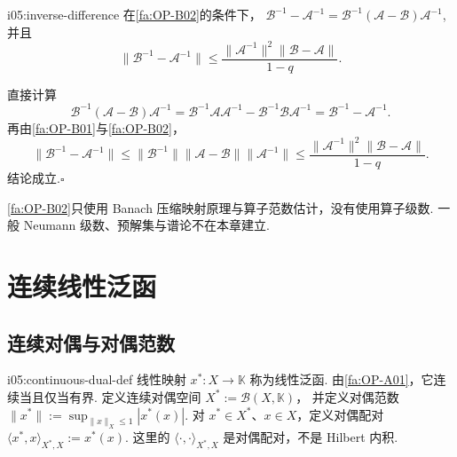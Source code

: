 \begin{FAProposition}[B][局部逆映射估计]{i05:inverse-difference}
在\autoref{fa:OP-B02}的条件下， \(\displaystyle \mathcal B^{-1}-\mathcal A^{-1} =\mathcal B^{-1}(\mathcal A-\mathcal B)\mathcal A^{-1}\),
并且
\[
\|\mathcal B^{-1}-\mathcal A^{-1}\|
\leqslant
\frac{\|\mathcal A^{-1}\|^2\|\mathcal B-\mathcal A\|}{1-q}.
\]
\end{FAProposition}

\begin{FAProof}
直接计算
\[
\mathcal B^{-1}(\mathcal A-\mathcal B)\mathcal A^{-1}
=\mathcal B^{-1}\mathcal A\mathcal A^{-1}-\mathcal B^{-1}\mathcal B\mathcal A^{-1}
=\mathcal B^{-1}-\mathcal A^{-1}.
\]
再由\autoref{fa:OP-B01}与\autoref{fa:OP-B02}，
\[
\|\mathcal B^{-1}-\mathcal A^{-1}\|
\leqslant\|\mathcal B^{-1}\|\|\mathcal A-\mathcal B\|\|\mathcal A^{-1}\|
\leqslant
\frac{\|\mathcal A^{-1}\|^2\|\mathcal B-\mathcal A\|}{1-q}.
\]
结论成立.\hfill\(\square\)
\end{FAProof}

\begin{FARemark}[本章的证明边界]
\autoref{fa:OP-B02}只使用 Banach 压缩映射原理与算子范数估计，没有使用算子级数. 一般 Neumann 级数、预解集与谱论不在本章建立.
\end{FARemark}

\section{连续线性泛函}\label{sec:i05-continuous-dual}

\subsection{连续对偶与对偶范数}

\begin{FADefinition}[A][连续线性泛函与连续对偶]{i05:continuous-dual-def}
线性映射 \(\displaystyle x^*:X\to\mathbb K\) 称为线性泛函. 由\autoref{fa:OP-A01}，它连续当且仅当有界. 定义连续对偶空间 \(\displaystyle X^*:=\mathcal B(X,\mathbb K)\)，
并定义对偶范数 \(\displaystyle \|x^*\| :=\sup_{\|x\|_X\leqslant1}|x^*(x)|\).
对 \(\displaystyle x^*\in X^*\)、\(\displaystyle x\in X\)，定义对偶配对 \(\displaystyle \langle x^*,x\rangle_{X^*,X}:=x^*(x)\).
这里的 \(\displaystyle \langle\cdot,\cdot\rangle_{X^*,X}\) 是对偶配对，不是 Hilbert 内积.
\end{FADefinition}

